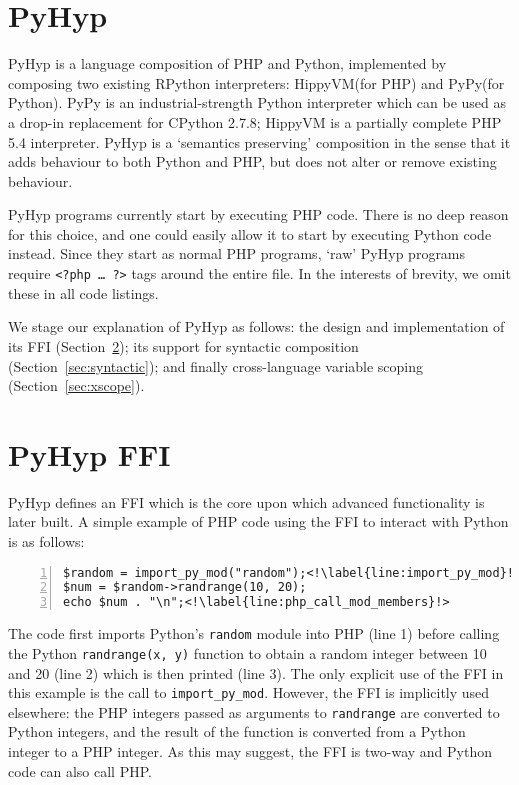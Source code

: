 \documentclass[a4paper,UKenglish]{lipics-v2016}
\newcommand{\ourvm}{PyHyp\xspace}
\newcommand{\hippy}{HippyVM\xspace}
\newcommand{\pypy}{PyPy\xspace}
\begin{document}
\section{\ourvm}

\ourvm is a language composition of PHP and Python, implemented by composing
two existing RPython interpreters: \hippy (for PHP) and \pypy (for Python). \pypy is
an industrial-strength Python interpreter which can be used as a drop-in
replacement for CPython 2.7.8; \hippy is a partially complete PHP 5.4 interpreter.
\ourvm is a `semantics preserving' composition in the sense that it adds behaviour to
both Python and PHP, but does not alter or remove existing behaviour.

\ourvm programs currently start by executing PHP code. There
is no deep reason for this choice, and one could easily allow it to start by executing
Python code instead. Since they start as normal PHP programs, `raw' \ourvm programs
require \texttt{<?php~\ldots~?>} tags around the entire file. In the interests of brevity,
we omit these in all code listings.

We stage our explanation of
\ourvm as follows: the design and implementation of its FFI (Section~\ref{sec:ffi design});
its support for syntactic composition (Section~\ref{sec:syntactic}); and finally
cross-language variable scoping (Section~\ref{sec:xscope}).


\section{\ourvm FFI}
\label{sec:ffi design}

\ourvm defines an FFI which is the core upon which advanced functionality is
later built. A simple example of PHP code using the FFI to interact with Python is as
follows:
\begin{lstlisting}[label={lst:import_py_mod}, numbers=left]
$random = import_py_mod("random");<!\label{line:import_py_mod}!>
$num = $random->randrange(10, 20);
echo $num . "\n";<!\label{line:php_call_mod_members}!>
\end{lstlisting}
The code first imports Python's \texttt{random} module into PHP (line 1) before
calling the Python \texttt{randrange(x, y)} function to obtain a random integer between
10 and 20 (line 2) which is then printed (line 3). The
only explicit use of the FFI in this example is the call to \texttt{import\_py\_mod}. However, the FFI is implicitly
used elsewhere: the PHP integers passed as arguments to \texttt{randrange}
are converted to Python integers, and the result of the function is converted
from a Python integer to a PHP integer. As this may suggest, the FFI is two-way
and Python code can also call PHP.
\end{document}
